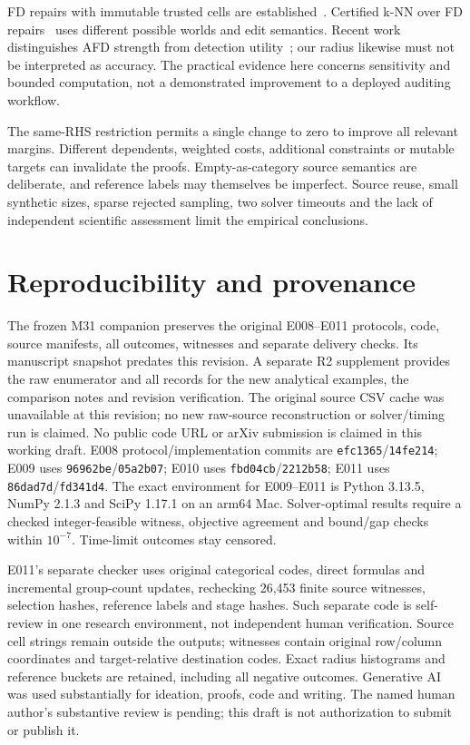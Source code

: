 \documentclass[11pt]{article}
\begin{document}
FD repairs with immutable trusted cells are established~\cite{repairs}.
Certified k-NN over FD repairs~\cite{knn} uses different possible worlds and
edit semantics. Recent work distinguishes AFD strength from detection
utility~\cite{wan}; our radius likewise must not be interpreted as accuracy.
The practical evidence here concerns sensitivity and bounded computation,
not a demonstrated improvement to a deployed auditing workflow.

The same-RHS restriction permits a single change to zero to improve all
relevant margins. Different dependents, weighted costs, additional constraints
or mutable targets can invalidate the proofs. Empty-as-category source semantics
are deliberate, and reference labels may themselves be imperfect. Source reuse,
small synthetic sizes, sparse rejected sampling, two solver timeouts and the
lack of independent scientific assessment limit the empirical conclusions.

\section{Reproducibility and provenance}
The frozen M31 companion preserves the original E008--E011 protocols, code,
source manifests,
all outcomes, witnesses and separate delivery checks. Its manuscript snapshot
predates this revision. A separate R2 supplement provides the raw enumerator
and all records for the new analytical examples, the comparison notes and
revision verification. The original source CSV cache was unavailable at this
revision; no new raw-source reconstruction or solver/timing run is claimed.
No public code URL or
arXiv submission is claimed in this working draft. E008 protocol/implementation
commits are \texttt{efc1365}/\texttt{14fe214}; E009 uses
\texttt{96962be}/\texttt{05a2b07}; E010 uses
\texttt{fbd04cb}/\texttt{2212b58}; E011 uses
\texttt{86dad7d}/\texttt{fd341d4}. The exact environment for E009--E011 is
Python 3.13.5, NumPy 2.1.3 and SciPy 1.17.1 on an arm64 Mac.
Solver-optimal results require a checked integer-feasible witness, objective
agreement and bound/gap checks within $10^{-7}$. Time-limit outcomes stay censored.

E011's separate checker uses original categorical codes, direct formulas and
incremental group-count updates, rechecking 26,453 finite source witnesses,
selection hashes, reference labels and stage hashes. Such separate code is
self-review in one research environment, not independent human verification.
Source cell strings remain outside the outputs; witnesses contain original
row/column coordinates and target-relative destination codes. Exact radius
histograms and reference buckets are retained, including all negative outcomes.
Generative AI was used substantially for ideation, proofs, code and writing.
The named human author's substantive review is pending; this draft is not
authorization to submit or publish it.
\end{document}
